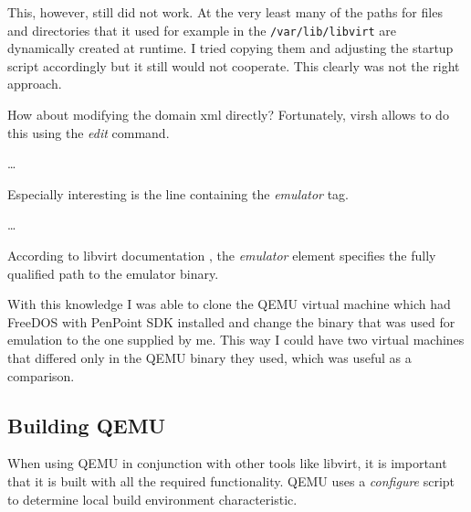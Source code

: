 This, however, still did not work.  At the very least many of the paths for files
and directories that it used for example in the \lstinline{/var/lib/libvirt} are
dynamically created at runtime.  I tried copying them and adjusting the startup
script accordingly but it still would not cooperate.  This clearly was not the
right approach.

How about modifying the domain xml directly?  Fortunately, virsh allows to do
this using the \emph{edit} command.

\begin{codeblock}
    

    \dots

    
\end{codeblock}

\noindent
Especially interesting is the line containing the \emph{emulator} tag.

\begin{codeblock}
    
    
    \dots

    
\end{codeblock}

\noindent
According to libvirt documentation \cite{libvirt}, the \emph{emulator} element
specifies the fully qualified path to the emulator binary.

With this knowledge I was able to clone the QEMU virtual machine which had
FreeDOS with PenPoint SDK installed and change the binary that was used for
emulation to the one supplied by me.  This way I could have two virtual machines
that differed only in the QEMU binary they used, which was useful as
a comparison.

\subsection{Building QEMU} %


When using QEMU in conjunction with other tools like libvirt, it is important
that it is built with all the required functionality.  QEMU uses
a \emph{configure} script to determine local build environment characteristic.

